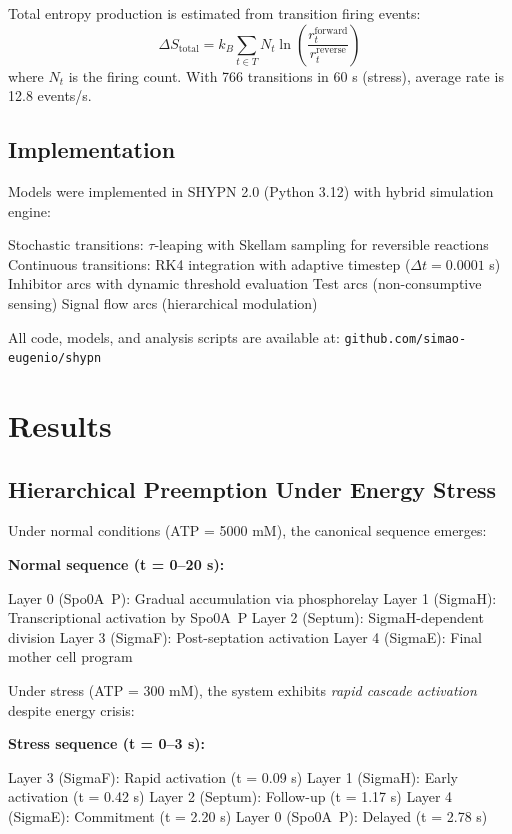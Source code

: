 \documentclass[twocolumn,11pt]{article}
\begin{document}
Total entropy production is estimated from transition firing events:
\begin{equation}
    \Delta S_{\text{total}} = k_B \sum_{t \in T} N_t \ln\left(\frac{r_t^{\text{forward}}}{r_t^{\text{reverse}}}\right)
\end{equation}
where $N_t$ is the firing count. With 766 transitions in 60 s (stress), average rate is 12.8 events/s.

\subsection{Implementation}

Models were implemented in SHYPN 2.0 (Python 3.12) with hybrid simulation engine:

Stochastic transitions: $\tau$-leaping with Skellam sampling for reversible reactions
Continuous transitions: RK4 integration with adaptive timestep ($\Delta t = 0.0001$ s)
Inhibitor arcs with dynamic threshold evaluation
Test arcs (non-consumptive sensing)
Signal flow arcs (hierarchical modulation)


All code, models, and analysis scripts are available at: \texttt{github.com/simao-eugenio/shypn}

\section{Results}

\subsection{Hierarchical Preemption Under Energy Stress}

Under normal conditions (ATP = 5000 mM), the canonical sequence emerges:

\textbf{Normal sequence (t = 0--20 s):}

Layer 0 (Spo0A~P): Gradual accumulation via phosphorelay
Layer 1 (SigmaH): Transcriptional activation by Spo0A~P
Layer 2 (Septum): SigmaH-dependent division
Layer 3 (SigmaF): Post-septation activation
Layer 4 (SigmaE): Final mother cell program


Under stress (ATP = 300 mM), the system exhibits \textit{rapid cascade activation} despite energy crisis:

\textbf{Stress sequence (t = 0--3 s):}

Layer 3 (SigmaF): Rapid activation (t = 0.09 s)
Layer 1 (SigmaH): Early activation (t = 0.42 s)
Layer 2 (Septum): Follow-up (t = 1.17 s)
Layer 4 (SigmaE): Commitment (t = 2.20 s)
Layer 0 (Spo0A~P): Delayed (t = 2.78 s)
\end{document}
